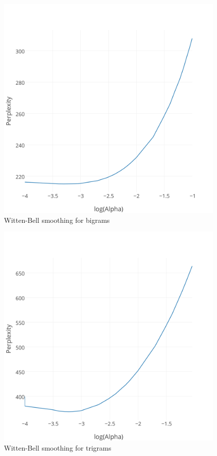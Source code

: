 \documentclass[11pt]{article}
\begin{document}
\begin{figure}[f]
  \centering
  \includegraphics{wb_2grams.png}
  \caption{Witten-Bell smoothing for bigrams}
  \label{fig:wb2}
\end{figure}

\begin{figure}[f]
  \centering
  \includegraphics{wb_3grams.png}
  \caption{Witten-Bell smoothing for trigrams}
  \label{fig:wb3}
\end{figure}

%
%
\end{document}
